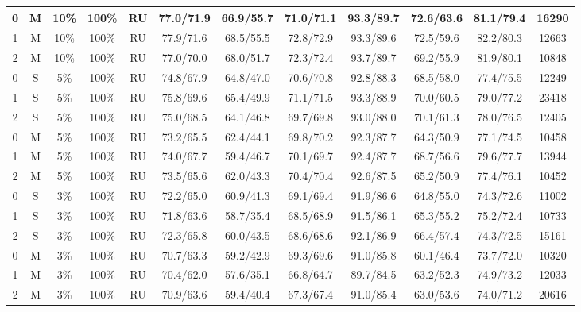 \begin{table*}
{\begin{tabular}{|c|c|c|c|c||c|c|c|c|c|c||c|}
0 & M & 10\% & 100\% & RU & 77.0/71.9 & 66.9/55.7 & 71.0/71.1 & 93.3/89.7 & 72.6/63.6 & 81.1/79.4 & 16290 \\ \hline
1 & M & 10\% & 100\% & RU & 77.9/71.6 & 68.5/55.5 & 72.8/72.9 & 93.3/89.6 & 72.5/59.6 & 82.2/80.3 & 12663 \\ \hline
2 & M & 10\% & 100\% & RU & 77.0/70.0 & 68.0/51.7 & 72.3/72.4 & 93.7/89.7 & 69.2/55.9 & 81.9/80.1 & 10848 \\ \hline
0 & S & 5\% & 100\% & RU & 74.8/67.9 & 64.8/47.0 & 70.6/70.8 & 92.8/88.3 & 68.5/58.0 & 77.4/75.5 & 12249 \\ \hline
1 & S & 5\% & 100\% & RU & 75.8/69.6 & 65.4/49.9 & 71.1/71.5 & 93.3/88.9 & 70.0/60.5 & 79.0/77.2 & 23418 \\ \hline
2 & S & 5\% & 100\% & RU & 75.0/68.5 & 64.1/46.8 & 69.7/69.8 & 93.0/88.0 & 70.1/61.3 & 78.0/76.5 & 12405 \\ \hline
0 & M & 5\% & 100\% & RU & 73.2/65.5 & 62.4/44.1 & 69.8/70.2 & 92.3/87.7 & 64.3/50.9 & 77.1/74.5 & 10458 \\ \hline
1 & M & 5\% & 100\% & RU & 74.0/67.7 & 59.4/46.7 & 70.1/69.7 & 92.4/87.7 & 68.7/56.6 & 79.6/77.7 & 13944 \\ \hline
2 & M & 5\% & 100\% & RU & 73.5/65.6 & 62.0/43.3 & 70.4/70.4 & 92.6/87.5 & 65.2/50.9 & 77.4/76.1 & 10452 \\ \hline
0 & S & 3\% & 100\% & RU & 72.2/65.0 & 60.9/41.3 & 69.1/69.4 & 91.9/86.6 & 64.8/55.0 & 74.3/72.6 & 11002 \\ \hline
1 & S & 3\% & 100\% & RU & 71.8/63.6 & 58.7/35.4 & 68.5/68.9 & 91.5/86.1 & 65.3/55.2 & 75.2/72.4 & 10733 \\ \hline
2 & S & 3\% & 100\% & RU & 72.3/65.8 & 60.0/43.5 & 68.6/68.6 & 92.1/86.9 & 66.4/57.4 & 74.3/72.5 & 15161 \\ \hline
0 & M & 3\% & 100\% & RU & 70.7/63.3 & 59.2/42.9 & 69.3/69.6 & 91.0/85.8 & 60.1/46.4 & 73.7/72.0 & 10320 \\ \hline
1 & M & 3\% & 100\% & RU & 70.4/62.0 & 57.6/35.1 & 66.8/64.7 & 89.7/84.5 & 63.2/52.3 & 74.9/73.2 & 12033 \\ \hline
2 & M & 3\% & 100\% & RU & 70.9/63.6 & 59.4/40.4 & 67.3/67.4 & 91.0/85.4 & 63.0/53.6 & 74.0/71.2 & 20616 \\ \hline
\end{tabular}}
\end{table*}

